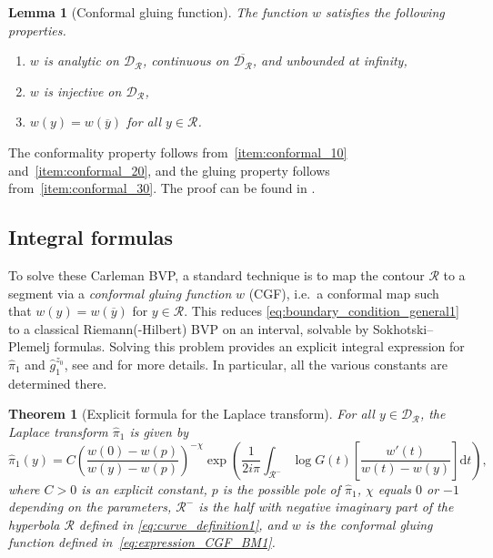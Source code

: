 \documentclass[11pt]{article}
\newcommand\citeS[1]{\cite{#1}}
\newcommand{\R}{\mathcal{R}}
\newcommand{\G}{\mathcal{D}_\mathcal{R}}
\newtheorem{theorem}[thm]{Theorem}
\newtheorem{lemm}[thm]{Lemma}
\theoremstyle{definition}
\begin{document}
\begin{lemm}[Conformal gluing function]
The function $w$ satisfies the following properties.
\begin{enumerate}[label={\rm (\roman{*})},ref={\rm (\roman{*})}]
     \item\label{item:conformal_10} $w$ is analytic on $\G$, continuous on $\overline{\G}$, and unbounded at infinity,
     \item\label{item:conformal_20} $w$ is injective on $\G$, 
     \item\label{item:conformal_30} $w(y)=w(\overline{y})$ for all $y\in\mathcal{R}$.
\end{enumerate}
\end{lemm} 
The conformality property follows from~\ref{item:conformal_10} and~\ref{item:conformal_20}, and the gluing property follows from~\ref{item:conformal_30}. The proof can be found in  \citeS{franceschi_raschel_tutte_2017}.


\subsection{Integral formulas}


To solve these Carleman BVP, a standard technique is to map the contour $\mathcal{R}$ to a segment via a \emph{conformal gluing function} $w$ (CGF), i.e.\ a conformal map such that $w(y)=w(\overline{y})$ for $y\in\mathcal{R}$.
This reduces \eqref{eq:boundary_condition_general1} to a classical Riemann(-Hilbert) BVP on an interval, solvable by Sokhotski–Plemelj formulas. 
Solving this problem provides an explicit integral expression for $\widehat{\pi}_1$ and $\widehat g_1^{z_0}$, see \citeS{franceschi_raschel_integral_2019} and \citeS{franceschi_green_2021} for more details. In particular, all the various constants are determined there.

\begin{theorem}[Explicit formula for the Laplace transform] 
\label{thm:mainexplicit}
For all $y\in \G$, the Laplace transform $\widehat \pi_1$ is given by
\begin{equation}
\label{eq:main_formula_with_constants1}
\widehat \pi_1(y)
=C  \left( \frac{w(0)-w(p)}{w(y)-w(p)} \right)^{-\chi}
 \exp\left(\frac{1}{2i\pi} \int_{\R^-} \log G(t) \left[ \frac{w'(t)}{w(t)-w(y)}
\right]
\mathrm{d}t\right),
\end{equation}
where $C>0$ is an explicit constant,
$p$ is the possible pole of $\widehat \pi_1$,
$\chi$ equals $0$ or $-1$ depending on the parameters, $\R^-$ is the half with negative imaginary part of the hyperbola $\R$ defined in \eqref{eq:curve_definition1}, and $w$ is the conformal gluing function defined in~\eqref{eq:expression_CGF_BM1}.%
\end{theorem}
\end{document}
